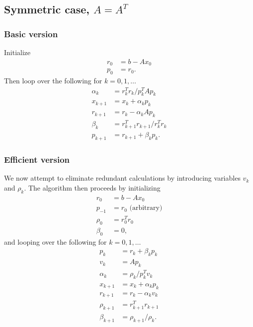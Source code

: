 \documentclass{article}
\begin{document}
\subsection{Symmetric case, $A = A^T$}
\subsubsection{Basic version}
Initialize
    \begin{subequations}\begin{align}
    r_0 &= b - Ax_0 \\
    p_0 &= r_0.
    \end{align}\end{subequations}
Then loop over the following for $k = 0, 1, \ldots$
    \begin{subequations}\begin{align}
    \alpha_k &= r_k^T r_k / p_k^T A p_k \\
    x_{k+1} &= x_k + \alpha_k p_k \\
    r_{k+1} &= r_k - \alpha_k A p_k \\
    \beta_k &= r_{k+1}^T r_{k+1} / r_k^T r_k \\
    p_{k+1} &= r_{k+1} + \beta_k p_k. 
    \end{align}\end{subequations}

\subsubsection{Efficient version}
We now attempt to eliminate redundant calculations by introducing variables
    $v_k$ and $\rho_k$.
The algorithm then proceeds by initializing
    \begin{subequations}\begin{align}
    r_0 &= b - Ax_0 \\
    p_{-1} &= r_0 \text{ (arbitrary)} \\
    \rho_{0} &= r_0^T r_0 \\
    \beta_0 &= 0,
    \end{align}\end{subequations}
and looping over the following for $k = 0, 1, \ldots$
    \begin{subequations}\begin{align}
    p_{k} &= r_{k} + \beta_k p_k \\
    v_k &= A p_k \\
    \alpha_k &= \rho_k / p_k^T v_k \\
    x_{k+1} &= x_k + \alpha_k p_k \\
    r_{k+1} &= r_k - \alpha_k v_k \\
    \rho_{k+1} &= r_{k+1}^T r_{k+1} \\
    \beta_{k+1} &= \rho_{k+1} / \rho_k.
    \end{align}\end{subequations}
\end{document}

